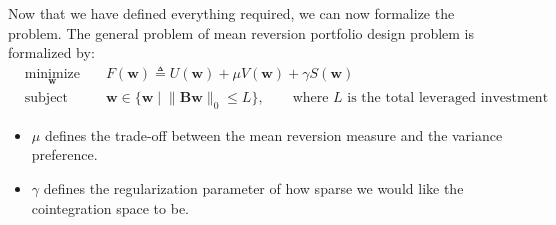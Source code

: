 \noindent Now that we have defined everything required, we can now formalize the problem. The general problem of mean reversion portfolio design problem is formalized by:
\begin{equation*}
    \begin{aligned}
         & \underset{\mathbf{w}}{\text{minimize}}
         &                                        & F(\mathbf{w}) \triangleq U(\mathbf{w}) + \mu V(\mathbf{w}) + \gamma S(\mathbf{w})                                                                       \\
         & \text{subject to}
         &                                        & \mathbf{w} \in \biggl\{ \mathbf{w} \mid \big\| \mathbf{B} \mathbf{w}\big\|_0 \leq L \biggr\}, \qquad \text{where $L$ is the total leveraged investment}
    \end{aligned}
\end{equation*}

\begin{itemize}
    \item $\mu$ defines the trade-off between the mean reversion measure and the variance preference.
    \item $\gamma$ defines the regularization parameter of how sparse we would like the cointegration space to be.
\end{itemize}

